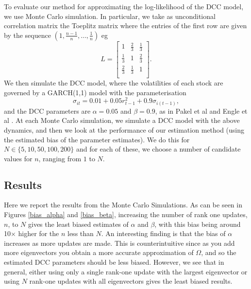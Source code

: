 \documentclass{article} %
\numberwithin{equation}{section} %
\numberwithin{figure}{section} %
\numberwithin{table}{section} %
\begin{document}
To evaluate our method for approximating the log-likelihood of the DCC model, we use Monte Carlo simulation. In particular, we take as unconditional correlation matrix the Toeplitz matrix where the entries of the first row are given by the sequence $(1, \frac{n-1}{n}, \ldots, \frac{1}{n})$ eg
\begin{equation}
  L=
    \begin{bmatrix}
      1 & \frac{2}{3}     &  \frac{1}{3}       \\
      \frac{1}{3} & 1 &  \frac{2}{3}        \\
       \frac{2}{3}  & \frac{1}{3} & 1  \\
    \end{bmatrix}.
\end{equation}
We then simulate the DCC model, where the volatilities of each stock are governed by a GARCH(1,1) model with the parameterisation
\begin{equation}
\sigma_{it} = 0.01 + 0.05 r_{t-1}^2 + 0.9\sigma_{i(t-1)},
\end{equation}
and the DCC parameters are $\alpha = 0.05$ and $\beta = 0.9$, as in Pakel et al \cite{pakel et al} and Engle et al \cite{engle et al}. At each Monte Carlo simulation, we simulate a DCC model with the above dynamics, and then we look at the performance of our estimation method (using the estimated bias of the parameter estimates). We do this for $N \in \{ 5,10,50,100,200\}$ and for each of these, we choose a number of candidate values for $n$, ranging from $1$ to $N$.

\subsection{Results}

Here we report the results from the Monte Carlo Simulations. As can be seen in Figures \ref{bias_alpha} and \ref{bias_beta}, increasing the number of rank one updates, $n$, to $N$ gives the least biased estimates of $\alpha$ and $\beta$, with this bias being around 10$\times$ higher for the $n$ less than $N$. An interesting finding is that the bias of $\alpha$ increases as more updates are made. This is counterintuitive since as you add more eigenvectors you obtain a more accurate approximation of $\Omega$, and so the estimated DCC parameters should be less biased. However, we see that in general, either using only a single rank-one update with the largest eigenvector or using $N$ rank-one updates with all eigenvectors gives the least biased results.
\end{document}
